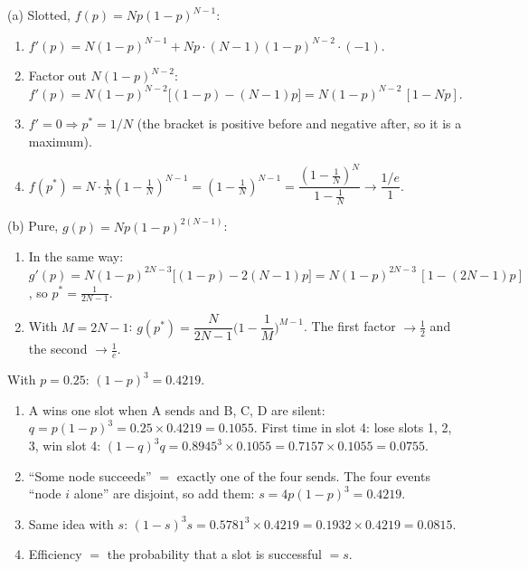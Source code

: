 (a) Slotted, $f(p)=Np(1-p)^{N-1}$:
\begin{enumerate}
  \item $f'(p)=N(1-p)^{N-1}+Np\cdot(N-1)(1-p)^{N-2}\cdot(-1)$.
  \item Factor out $N(1-p)^{N-2}$: $f'(p)=N(1-p)^{N-2}\big[(1-p)-(N-1)p\big]=N(1-p)^{N-2}\,[1-Np]$.
  \item $f'=0\Rightarrow p^*=1/N$ (the bracket is positive before and negative after, so it is a maximum).
  \item $f(p^*)=N\cdot\frac1N(1-\frac1N)^{N-1}=(1-\frac1N)^{N-1}=\dfrac{(1-\frac1N)^{N}}{1-\frac1N}\to\dfrac{1/e}{1}$.
\end{enumerate}
(b) Pure, $g(p)=Np(1-p)^{2(N-1)}$:
\begin{enumerate}
  \item In the same way: $g'(p)=N(1-p)^{2N-3}\big[(1-p)-2(N-1)p\big]=N(1-p)^{2N-3}\,[1-(2N-1)p]$, so $p^*=\frac1{2N-1}$.
  \item With $M=2N-1$: $g(p^*)=\dfrac{N}{2N-1}\Big(1-\dfrac1M\Big)^{M-1}$. The first factor $\to\frac12$ and the second $\to\frac1e$.
\end{enumerate}

With $p=0.25$: $(1-p)^3=0.4219$.
\begin{enumerate}
  \item[(a)] A wins one slot when A sends and B, C, D are silent: $q=p(1-p)^3=0.25\times0.4219=0.1055$.
  First time in slot 4: lose slots 1, 2, 3, win slot 4: $(1-q)^3q=0.8945^3\times0.1055=0.7157\times0.1055=0.0755$.
  \item[(b)] ``Some node succeeds'' $=$ exactly one of the four sends. The four events ``node $i$ alone'' are disjoint, so add them: $s=4p(1-p)^3=0.4219$.
  \item[(c)] Same idea with $s$: $(1-s)^3s=0.5781^3\times0.4219=0.1932\times0.4219=0.0815$.
  \item[(d)] Efficiency $=$ the probability that a slot is successful $=s$.
\end{enumerate}

